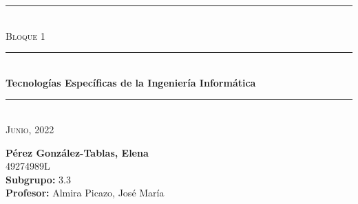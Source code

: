 \begin{titlepage}
	\begin{center}
		\rule{15cm}{0pt} \\
		[3cm]
		\textsc{\Large Bloque 1} \\
		\rule{15cm}{1pt} \\
		[0.25cm]
		\huge{\bfseries Tecnologías Específicas de la Ingeniería Informática} \\
		\rule{15cm}{1pt} \\
		[0.25cm]
		\textsc{\Large Junio, 2022}\\
		[9cm]
	\end{center}
	\begin{flushright}
		\textbf{Pérez González-Tablas, Elena} \\
		[0.25cm]
		49274989L \\
		[0.25cm]
		\textbf{Subgrupo:} 3.3 \\
		[0.25cm]
		\textbf{Profesor:} Almira Picazo, José María\\
	\end{flushright}
\end{titlepage}
\newpage
\begin{titlepage}
	\begin{flushleft}
	\end{flushleft}
\end{titlepage}